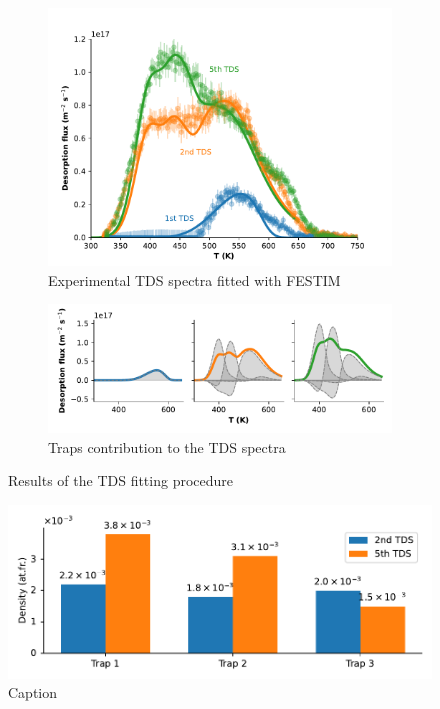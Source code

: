 \begin{figure}[h!]
    \centering
    \begin{subfigure}{\linewidth}
        \includegraphics[width=\linewidth]{Figures/Chapter5/ialovega_tds.pdf}
        \caption{Experimental TDS spectra fitted with FESTIM}
        \label{fig: 3 TDS}
    \end{subfigure}
    \begin{subfigure}{\linewidth}
        \includegraphics[width=\linewidth]{Figures/Chapter5/tds_trap_distribution.pdf}
        \caption{Traps contribution to the TDS spectra}
        \label{fig: trap contributions}
    \end{subfigure}
    \caption{Results of the TDS fitting procedure}
    \label{fig: fitted TDS}
\end{figure}

\begin{figure}
    \centering
    \includegraphics[width=\linewidth]{Figures/Chapter5/trap_densities.pdf}
    \caption{Caption}
    \label{fig:density evolution}
\end{figure}

